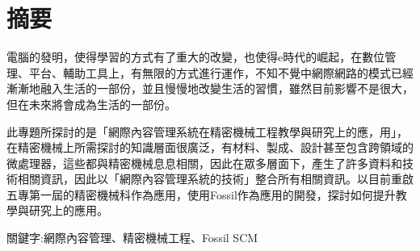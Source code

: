 \setcounter{page}{0}  %
\chapter*{摘要}
\renewcommand{\baselinestretch}{2} %
\twelve 電腦的發明，使得學習的方式有了重大的改變，也使得e時代的崛起，在數位管理、平台、輔助工具上，有無限的方式進行運作，不知不覺中網際網路的模式已經漸漸地融入生活的一部份，並且慢慢地改變生活的習慣，雖然目前影響不是很大，但在未來將會成為生活的一部份。
\\
\par
\renewcommand{\baselinestretch}{1} %
\twelve 此專題所探討的是「網際內容管理系統在精密機械工程教學與研究上的應，用」，在精密機械上所需探討的知識層面很廣泛，有材料、製成、設計甚至包含跨領域的微處理器，這些都與精密機械息息相關，因此在眾多層面下，產生了許多資料和技術相關資訊，因此以「網際內容管理系統的技術」整合所有相關資訊。以目前重啟五專第一屆的精密機械科作為應用，使用Fossil作為應用的開發，探討如何提升教學與研究上的應用。\\
\par
\begin{center}
\twelve 關鍵字:網際內容管理、精密機械工程、Fossil SCM
\end{center}
\par